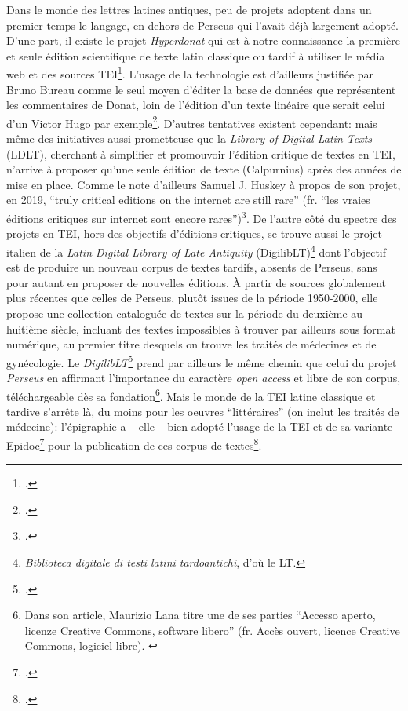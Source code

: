 Dans le monde des lettres latines antiques, peu de projets adoptent dans un premier temps le langage, en dehors de Perseus qui l'avait déjà largement adopté.  D'une part, il existe le projet \textit{Hyperdonat} qui est à notre connaissance la première et seule édition scientifique de texte latin classique ou tardif à utiliser le média web et des sources TEI\footcite{bureau2008hyperdonat}. L'usage de la technologie est d'ailleurs justifiée par Bruno Bureau comme le seul moyen d'éditer la base de données que représentent les commentaires de Donat, loin de l'édition d'un texte linéaire que serait celui d'un Victor Hugo par exemple\footcite{chaire_de_recherche_sur_les_ecritures_numeriques_exemple_2018}. D'autres tentatives existent cependant: mais même des initiatives aussi prometteuse que la \textit{Library of Digital Latin Texts} (LDLT), cherchant à simplifier et promouvoir l'édition critique de textes en TEI, n'arrive à proposer qu'une seule édition de texte (Calpurnius) après des années de mise en place. Comme le note d'ailleurs Samuel J. Huskey à propos de son projet, en 2019, ``truly critical editions on the internet are still rare'' (fr. ``les vraies éditions critiques sur internet sont encore rares'')\footcite{huskey_digital_2019}. De l'autre côté du spectre des projets en TEI, hors des objectifs d'éditions critiques, se trouve aussi le projet italien de la  \textit{Latin Digital Library of Late Antiquity} (DigilibLT)\footnote{\textit{Biblioteca digitale di testi latini tardoantichi}, d'où le LT.} dont l'objectif est de produire un nouveau corpus de textes tardifs, absents de Perseus, sans pour autant en proposer de nouvelles éditions. À partir de sources globalement plus récentes que celles de Perseus, plutôt issues de la période 1950-2000, elle propose une collection cataloguée de textes sur la période du deuxième au huitième siècle, incluant des textes impossibles à trouver par ailleurs sous format numérique, au premier titre desquels on trouve les traités de médecines et de gynécologie. Le \textit{DigilibLT}\footcite{lana_metodologie_2012} prend par ailleurs le même chemin que celui du projet \textit{Perseus} en affirmant l'importance du caractère \textit{open access} et libre de son corpus, téléchargeable dès sa fondation\footnote{Dans son article, Maurizio Lana titre une de ses parties ``Accesso aperto, licenze Creative Commons, software libero'' (fr. Accès ouvert, licence Creative Commons, logiciel libre). \cite{lana_metodologie_2012}}. Mais le monde de la TEI latine classique et tardive s'arrête là, du moins pour les oeuvres ``littéraires'' (on inclut les traités de médecine): l'épigraphie a -- elle -- bien adopté l'usage de la TEI et de sa variante Epidoc\footcite{elliott2007epidoc} pour la publication de ces corpus de textes\footcite{bodard2007inscriptions,cayless2010epigraphy}.


